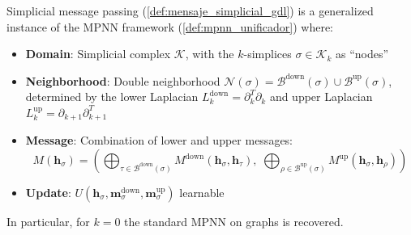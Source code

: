 \begin{proposition}\label{prop:tdl_mpnn}
Simplicial message passing (\autoref{def:mensaje_simplicial_gdl}) is a generalized instance of the \gls{MPNN} framework (\autoref{def:mpnn_unificador}) where:
\begin{itemize}
    \item \textbf{Domain}: Simplicial complex $\mathcal{K}$, with the $k$-simplices $\sigma \in \mathcal{K}_k$ as ``nodes''
    \item \textbf{Neighborhood}: Double neighborhood $\mathcal{N}(\sigma) = \mathcal{B}^{\mathrm{down}}(\sigma) \cup \mathcal{B}^{\mathrm{up}}(\sigma)$, determined by the lower Laplacian $L_k^{\mathrm{down}} = \partial_k^T \partial_k$ and upper Laplacian $L_k^{\mathrm{up}} = \partial_{k+1} \partial_{k+1}^T$
    \item \textbf{Message}: Combination of lower and upper messages:
    \[
    M(\mathbf{h}_\sigma) = \left(\bigoplus_{\tau \in \mathcal{B}^{\mathrm{down}}(\sigma)} M^{\mathrm{down}}(\mathbf{h}_\sigma, \mathbf{h}_\tau),\; \bigoplus_{\rho \in \mathcal{B}^{\mathrm{up}}(\sigma)} M^{\mathrm{up}}(\mathbf{h}_\sigma, \mathbf{h}_\rho)\right)
    \]
    \item \textbf{Update}: $U(\mathbf{h}_\sigma, \mathbf{m}_\sigma^{\mathrm{down}}, \mathbf{m}_\sigma^{\mathrm{up}})$ learnable
\end{itemize}
In particular, for $k=0$ the standard \gls{MPNN} on graphs is recovered.
\end{proposition}

